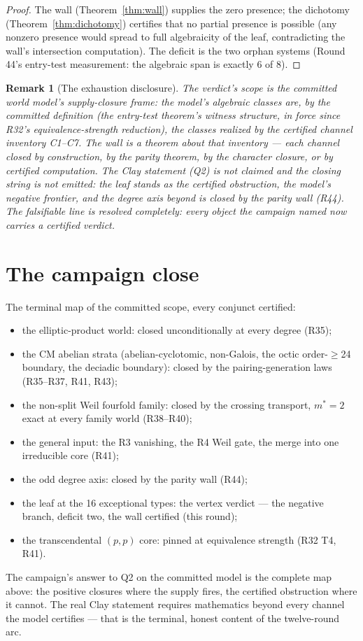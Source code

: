 \documentclass[11pt]{article}
\newtheorem{remark}[theorem]{Remark}
\begin{document}
\begin{proof}
The wall (Theorem~\ref{thm:wall}) supplies the zero presence; the dichotomy
(Theorem~\ref{thm:dichotomy}) certifies that no partial presence is possible (any nonzero
presence would spread to full algebraicity of the leaf, contradicting the wall's
intersection computation).  The deficit is the two orphan systems
(Round 44's entry-test measurement: the algebraic span is exactly 6 of 8).
\end{proof}

\begin{remark}[The exhaustion disclosure]
The verdict's scope is the committed world model's supply-closure frame: the model's
algebraic classes are, by the committed definition (the entry-test theorem's witness
structure, in force since R32's equivalence-strength reduction), the classes realized by
the certified channel inventory C1--C7.  The wall is a theorem about that inventory ---
each channel closed by construction, by the parity theorem, by the character closure, or
by certified computation.  The Clay statement (Q2) is not claimed and the closing string
is not emitted: the leaf stands as the certified obstruction, the model's negative
frontier, and the degree axis beyond is closed by the parity wall (R44).  The falsifiable
line is resolved completely: every object the campaign named now carries a certified
verdict.
\end{remark}

\section{The campaign close}

The terminal map of the committed scope, every conjunct certified:
\begin{itemize}
\item the elliptic-product world: closed unconditionally at every degree (R35);
\item the CM abelian strata (abelian-cyclotomic, non-Galois, the octic order-$\geq$24
  boundary, the deciadic boundary): closed by the pairing-generation laws (R35--R37, R41, R43);
\item the non-split Weil fourfold family: closed by the crossing transport, $m^*=2$ exact
  at every family world (R38--R40);
\item the general input: the R3 vanishing, the R4 Weil gate, the merge into one
  irreducible core (R41);
\item the odd degree axis: closed by the parity wall (R44);
\item the leaf at the 16 exceptional types: the vertex verdict --- the negative branch,
  deficit two, the wall certified (this round);
\item the transcendental $(p,p)$ core: pinned at equivalence strength (R32 T4, R41).
\end{itemize}
The campaign's answer to Q2 on the committed model is the complete map above: the
positive closures where the supply fires, the certified obstruction where it cannot.  The
real Clay statement requires mathematics beyond every channel the model certifies --- that
is the terminal, honest content of the twelve-round arc.
\end{document}
